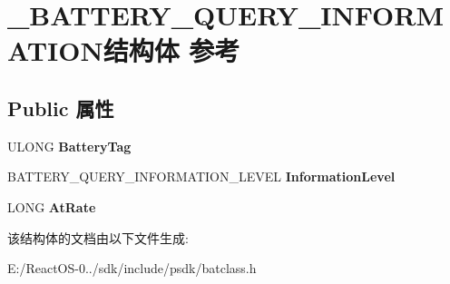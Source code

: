 \hypertarget{struct___b_a_t_t_e_r_y___q_u_e_r_y___i_n_f_o_r_m_a_t_i_o_n}{}\section{\+\_\+\+B\+A\+T\+T\+E\+R\+Y\+\_\+\+Q\+U\+E\+R\+Y\+\_\+\+I\+N\+F\+O\+R\+M\+A\+T\+I\+O\+N结构体 参考}
\label{struct___b_a_t_t_e_r_y___q_u_e_r_y___i_n_f_o_r_m_a_t_i_o_n}
\subsection*{Public 属性}
\begin{DoxyCompactItemize}
\item 
\mbox{\label{struct___b_a_t_t_e_r_y___q_u_e_r_y___i_n_f_o_r_m_a_t_i_o_n_afaa833322956066dc08809ff6c96ae45}} 
U\+L\+O\+NG {\bfseries Battery\+Tag}
\item 
\mbox{\label{struct___b_a_t_t_e_r_y___q_u_e_r_y___i_n_f_o_r_m_a_t_i_o_n_aadfcf5f005273332f9ffd521943840cd}} 
B\+A\+T\+T\+E\+R\+Y\+\_\+\+Q\+U\+E\+R\+Y\+\_\+\+I\+N\+F\+O\+R\+M\+A\+T\+I\+O\+N\+\_\+\+L\+E\+V\+EL {\bfseries Information\+Level}
\item 
\mbox{\label{struct___b_a_t_t_e_r_y___q_u_e_r_y___i_n_f_o_r_m_a_t_i_o_n_ac8b580666b776ef20d5a39302be5893f}} 
L\+O\+NG {\bfseries At\+Rate}
\end{DoxyCompactItemize}


该结构体的文档由以下文件生成\+:\begin{DoxyCompactItemize}
\item 
E\+:/\+React\+O\+S-\/0../sdk/include/psdk/batclass.\+h\end{DoxyCompactItemize}
